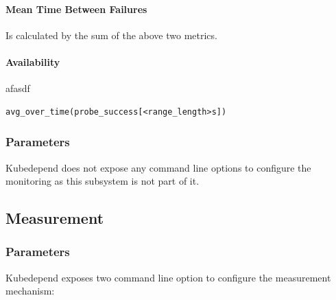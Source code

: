  \paragraph{Mean Time Between Failures} Is calculated by the sum of the above two metrics.
 
 \paragraph{Availability} afasdf
 
 \vspace{0.5cm}
 \begin{minipage}{\linewidth}
 	\begin{lstlisting}[caption={Availability defined in PromQL}, label={lst:promql-availability}]
 	avg_over_time(probe_success[<range_length>s])
 	\end{lstlisting}
 \end{minipage}

\subsubsection{Parameters}

Kubedepend does not expose any command line options to configure the monitoring as this subsystem is not part of it.

\subsection{Measurement} \label{test-impl-measurement}


\subsubsection{Parameters}

Kubedepend exposes two command line option to configure the measurement mechanism:

